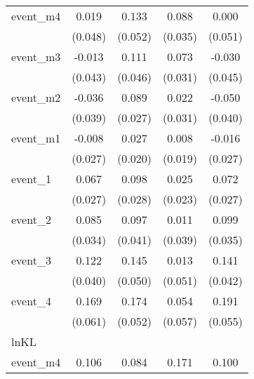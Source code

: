 \begin{table}[htbp]
\begin{tabular}{l*{4}{c}}
event\_m4    &       0.019         &       0.133\sym{*}  &       0.088\sym{*}  &       0.000         \\
            &     (0.048)         &     (0.052)         &     (0.035)         &     (0.051)         \\
[1em]
event\_m3    &      -0.013         &       0.111\sym{*}  &       0.073\sym{*}  &      -0.030         \\
            &     (0.043)         &     (0.046)         &     (0.031)         &     (0.045)         \\
[1em]
event\_m2    &      -0.036         &       0.089\sym{***}&       0.022         &      -0.050         \\
            &     (0.039)         &     (0.027)         &     (0.031)         &     (0.040)         \\
[1em]
event\_m1    &      -0.008         &       0.027         &       0.008         &      -0.016         \\
            &     (0.027)         &     (0.020)         &     (0.019)         &     (0.027)         \\
[1em]
event\_1     &       0.067\sym{*}  &       0.098\sym{***}&       0.025         &       0.072\sym{**} \\
            &     (0.027)         &     (0.028)         &     (0.023)         &     (0.027)         \\
[1em]
event\_2     &       0.085\sym{*}  &       0.097\sym{*}  &       0.011         &       0.099\sym{**} \\
            &     (0.034)         &     (0.041)         &     (0.039)         &     (0.035)         \\
[1em]
event\_3     &       0.122\sym{**} &       0.145\sym{**} &       0.013         &       0.141\sym{***}\\
            &     (0.040)         &     (0.050)         &     (0.051)         &     (0.042)         \\
[1em]
event\_4     &       0.169\sym{**} &       0.174\sym{***}&       0.054         &       0.191\sym{***}\\
            &     (0.061)         &     (0.052)         &     (0.057)         &     (0.055)         \\
\hline
lnKL        &                     &                     &                     &                     \\
event\_m4    &       0.106         &       0.084         &       0.171\sym{**} &       0.100         \\

\end{tabular}
\end{table}
